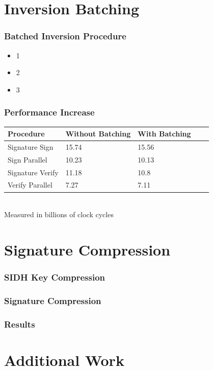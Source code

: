 \documentclass{beamer}
\begin{document}
\section{Inversion Batching}

\begin{frame}[fragile]
\frametitle{Batched Inversion Procedure}
\begin{itemize}
\item<1-> 1
\item<2-> 2
\item<3-> 3
\end{itemize}
\end{frame}

\begin{frame}
\frametitle{Performance Increase}
\begin{center}
\begin{tabular}{@{}lllll@{}}
	\toprule
	Procedure & Without Batching & With Batching\\
	\midrule
	Signature Sign & 15.74 & 15.56\\
	Sign Parallel & 10.23 & 10.13\\
	Signature Verify & 11.18 & 10.8\\
	Verify Parallel & 7.27 & 7.11\\
	\bottomrule
\end{tabular}\\
Measured in billions of clock cycles
\end{center}

\end{frame}

\section{Signature Compression}

\begin{frame}
\frametitle{SIDH Key Compression}

\end{frame}

\begin{frame}
\frametitle{Signature Compression}
\begin{center}
\end{center}
\end{frame}

\begin{frame}
\frametitle{Results}
\end{frame}

\section{Additional Work}

\begin{frame}
\frametitle{}

\begin{center}
\end{center}
\end{frame}
\end{document}
